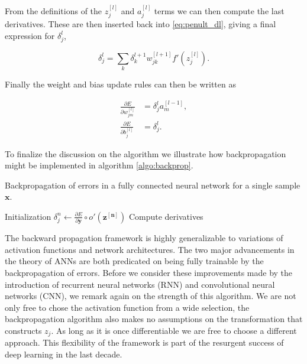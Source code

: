 \noindent From the definitions of the $z_j^{[l]}$ and $a_j^{[l]}$ terms we can then compute the last derivatives. These are then inserted back into \ref{eq:penult_dl}, giving a final expression for $\delta_j^l$,

\begin{equation}\label{eq:dl}
\delta_j^l = \sum_k \delta ^{l+1}_k w^{[l+1]}_{jk} f'(z_j^{[l]}).
\end{equation}

\noindent Finally the weight and bias update rules can then be written as 

\begin{align}
\frac{\partial E}{\partial w_{jm}^{[l]}} &= \delta_j^l a^{[l-1]}_m, \\
\frac{\partial E}{\partial b_{j}^{[l]}} &= \delta_j^l .
\end{align}

\noindent To finalize the discussion on the algorithm we illustrate how backpropagation might be implemented in algorithm \ref{algo:backprop}.

\begin{algorithm}
\caption{Backpropagation of errors in a fully connected neural network for a single sample $\mathbf{x}$.}\label{algo:backprop}
Initialization\;
$\delta_j^{n} \gets \frac{\partial E}{\partial \mathbf{y}} \circ o'(\mathbf{z^{[n]}})$\;
Compute derivatives\;  
\end{algorithm}

The backward propagation framework is highly generalizable to variations of activation functions and network architectures. The two major advancements in the theory of ANNs are both predicated on being fully trainable by the backpropagation of errors. Before we consider these improvements made by the introduction of recurrent neural networks (RNN) and convolutional neural networks (CNN), we remark again on the strength of this algorithm. We are not only free to chose the activation function from a wide selection, the backpropagation algorithm also makes no assumptions on the transformation that constructs $z_j$. As long as it is once differentiable we are free to choose a different approach. This flexibility of the framework is part of the resurgent success of deep learning in the last decade. 

